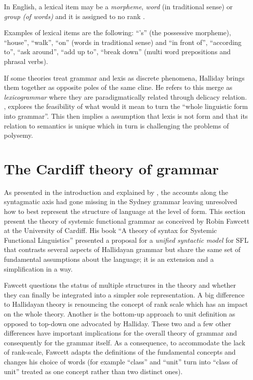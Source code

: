\begin{definition}\label{def:lexical-item}
	In English, a lexical item may be a \textit{morpheme}, \textit{word} (in traditional sense) or \textit{group (of words)} and it is assigned to no rank \citep[60]{Halliday2002}.
\end{definition}

Examples of lexical items are the following: ``'s'' (the possessive morpheme), ``house'', ``walk'', ``on'' (words in traditional sense) and ``in front of'', ``according to'', ``ask around'', ``add up to'', ``break down'' (multi word prepositions and phrasal verbs).

If some theories treat grammar and lexis as discrete phenomena, Halliday brings them together as opposite poles of the same cline. He refers to this merge as \textit{lexicogrammar} where they are paradigmatically related through delicacy relation.
\citet{Hasan2014}, explores the feasibility of what would it mean to turn the ``whole linguistic form into grammar''. This then implies a assumption that lexis is not form and that its relation to semantics is unique which  in turn is challenging the problems of polysemy. 


\section{The Cardiff theory of grammar}
\label{sec:cardiff-theory-grammar}
As presented in the introduction and explained by \citet{Bateman2008}, the accounts along the syntagmatic axis had gone missing in the Sydney grammar leaving unresolved how to best represent the structure of language at the level of form. This section present the theory of systemic functional grammar as conceived by Robin Fawcett at the University of Cardiff. His book ``A theory of syntax for Systemic Functional Linguistics'' \citep{Fawcett2000} presented a proposal for a \textit{unified syntactic model} for SFL that contrasts several aspects of Hallidayan grammar but share the same set of fundamental assumptions about the language; it is an extension and a simplification in a way.

Fawcett questions the status of multiple structures in the theory and whether they can finally be integrated into a simpler sole representation. A big difference to Hallidayan theory is renouncing the concept of rank scale which has an impact on the whole theory. Another is the bottom-up approach to unit definition as opposed to top-down one advocated by Halliday. These two and a few other differences have important implications for the overall theory of grammar and consequently for the grammar itself. As a consequence, to accommodate the lack of rank-scale, Fawcett adapts the definitions of the fundamental concepts and changes his choice of words (for example ``class'' and ``unit'' turn into ``class of unit'' treated as one concept rather than two distinct ones).


